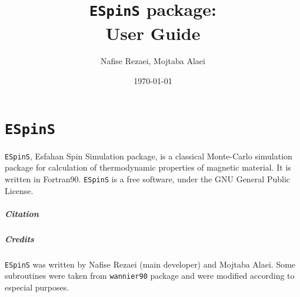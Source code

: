 \documentclass[10pt]{report}
\title{{\tt ESpinS} package: \\ User Guide} %
\author{Nafise Rezaei, Mojtaba Alaei} %
\date{\today} %
\begin{document}
\maketitle %



\setlength{\extrarowheight}{2pt}


\chapter{\tt ESpinS}
{\tt ESpinS}, Esfahan Spin Simulation package,  is a classical Monte-Carlo simulation package for calculation of thermodynamic properties of magnetic material. It is written in Fortran90.
{\tt ESpinS} is a free software, under the GNU General Public License.
\paragraph{Citation}
\paragraph{Credits}
{\tt ESpinS} was written by Nafise Rezaei (main developer) and Mojtaba Alaei.
Some subroutines were taken from {\tt wannier90} package and were modified according to especial purposes.
\end{document}
